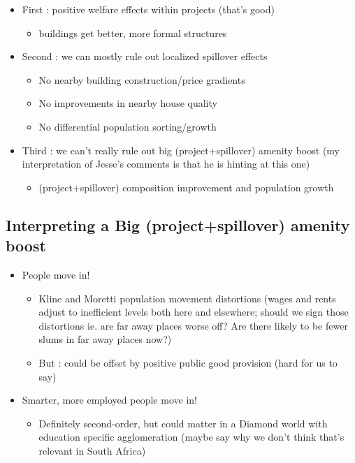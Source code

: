 \documentclass[12pt]{article}
\begin{document}
\begin{itemize}
	\item First : positive welfare effects within projects (that's good)
		\begin{itemize}
			\item buildings get better, more formal structures
		\end{itemize}
	\item Second : we can mostly rule out localized spillover effects
		\begin{itemize}
			\item No nearby building construction/price gradients
			\item No improvements in nearby house quality
			\item No differential population sorting/growth
		\end{itemize}
	\item Third : we can't really rule out big (project+spillover) amenity boost (my interpretation of Jesse's comments is that he is hinting at this one)
		\begin{itemize}
			\item (project+spillover) composition improvement and population growth
		\end{itemize}
\end{itemize}

\subsection*{Interpreting a Big (project+spillover) amenity boost}

\begin{itemize}
	\item People move in!
		\begin{itemize}
			\item Kline and Moretti population movement distortions (wages and rents adjust to inefficient levels both here and elsewhere; should we sign those distortions ie. are far away places worse off?  Are there likely to be fewer slums in far away places now?)
			\item But : could be offset by positive public good provision (hard for us to say)
		\end{itemize}
	\item Smarter, more employed people move in!
		\begin{itemize}
			\item Definitely second-order, but could matter in a Diamond world with education specific agglomeration (maybe say why we don't think that's relevant in South Africa)
		\end{itemize}
\end{itemize}
\end{document}
